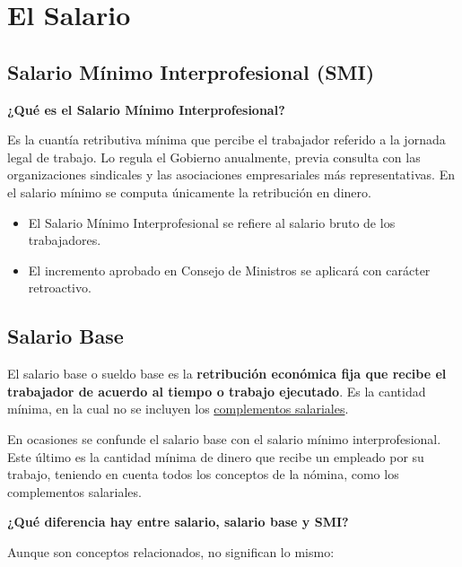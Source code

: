 \documentclass{article}
\begin{document}
	\section*{El Salario}
	
	\subsection*{Salario Mínimo Interprofesional (SMI)}
	
	\textbf{¿Qué es el Salario Mínimo Interprofesional?}
	
	Es la cuantía retributiva mínima que percibe el trabajador referido a la jornada legal de trabajo. Lo regula el Gobierno anualmente, previa consulta con las organizaciones sindicales y las asociaciones empresariales más representativas. En el salario mínimo se computa únicamente la retribución en dinero.
	
	\begin{itemize}
		\item El Salario Mínimo Interprofesional se refiere al salario bruto de los trabajadores.
		\item El incremento aprobado en Consejo de Ministros se aplicará con carácter retroactivo.
	\end{itemize}
	
	\subsection*{Salario Base}
	
	El salario base o sueldo base es la \textbf{retribución económica fija que recibe el trabajador de acuerdo al tiempo o trabajo ejecutado}. Es la cantidad mínima, en la cual no se incluyen los \underline{complementos salariales}.
	
	En ocasiones se confunde el salario base con el salario mínimo interprofesional. Este último es la cantidad mínima de dinero que recibe un empleado por su trabajo, teniendo en cuenta todos los conceptos de la nómina, como los complementos salariales.
	
	\textbf{¿Qué diferencia hay entre salario, salario base y SMI?}
	
	Aunque son conceptos relacionados, no significan lo mismo:
	
\end{document}
